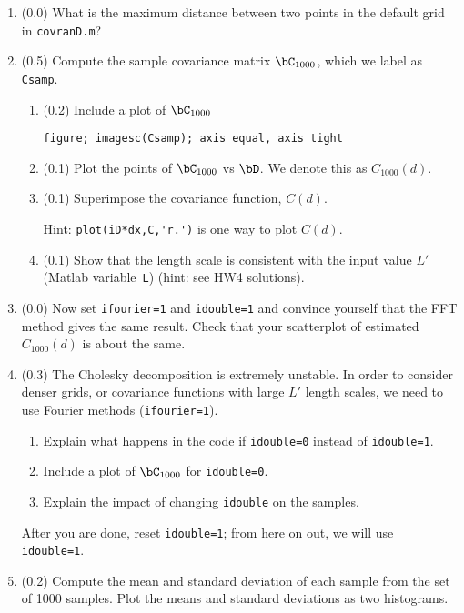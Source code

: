 \documentclass[11pt,titlepage,fleqn]{article}
\begin{document}
\begin{enumerate}
\item (0.0) What is the maximum distance between two points in the default grid in \verb+covranD.m+?

\item (0.5) Compute the sample covariance matrix $\bC_{1000}$, which we label as \verb+Csamp+.

\begin{enumerate}
\item (0.2) Include a plot of $\bC_{1000}$

\verb+figure; imagesc(Csamp); axis equal, axis tight+

\item (0.1) Plot the points of $\bC_{1000}$ vs $\bD$. We denote this as $C_{1000}(d)$.


\item (0.1) Superimpose the covariance function, $C(d)$.

Hint: \verb+plot(iD*dx,C,'r.')+ is one way to plot $C(d)$.

\item (0.1) Show that the length scale is consistent with the input value $L'$ (Matlab variable~\verb+L+) (hint: see HW4 solutions).
\end{enumerate}

\item (0.0) Now set \verb+ifourier=1+ and \verb+idouble=1+ and convince yourself that the FFT method gives the same result. Check that your scatterplot of estimated $C_{1000}(d)$ is about the same.

\item (0.3) The Cholesky decomposition is extremely unstable. In order to consider denser grids, or covariance functions with large $L'$ length scales, we need to use Fourier methods (\verb+ifourier=1+).

\begin{enumerate}
\item Explain what happens in the code if \verb+idouble=0+ instead of \verb+idouble=1+.
\item Include a plot of $\bC_{1000}$ for \verb+idouble=0+.
\item Explain the impact of changing \verb+idouble+ on the samples.
\end{enumerate}
%
After you are done, reset \verb+idouble=1+; from here on out, we will use \verb+idouble=1+.

\item (0.2) Compute the mean and standard deviation of each sample from the set of 1000 samples. Plot the means and standard deviations as two histograms.


\end{enumerate}
\end{document}
